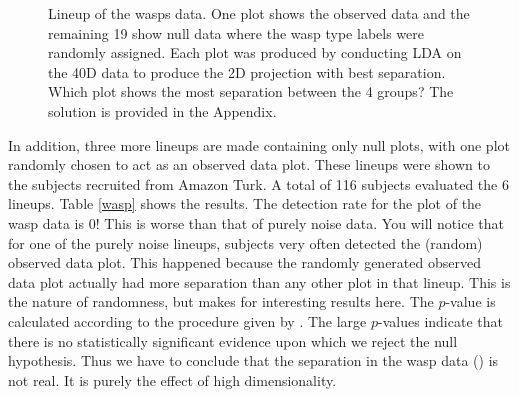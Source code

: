 \begin{figure}[hbtp]
   \centering
       \caption{Lineup of the wasps data. One plot shows the observed data and the remaining 19 show null data where the wasp type labels were randomly assigned. Each plot was produced by conducting LDA on the 40D data to produce the 2D projection with best separation. Which plot shows the most separation between the 4 groups? The solution is provided in the Appendix.}
       \label{toth_lineup}
\end{figure} 

In addition, three more lineups are made containing only null plots, with one plot randomly chosen to act as an observed data plot. These lineups were shown to the subjects recruited from Amazon Turk.  A total of 116 subjects evaluated the 6 lineups. Table \ref{wasp} shows the results. The detection rate for the plot of the wasp data is 0! This is worse than that of purely noise data. You will notice that for one of the purely noise lineups, subjects very often detected the (random) observed data plot. This happened because the randomly generated observed data plot actually had more separation than any other plot in that lineup. This is the nature of randomness, but makes for interesting results here. The $p$-value is calculated according to the procedure given by \cite{majumder:2013}. The large $p$-values indicate that there is no statistically significant evidence upon which we reject the null hypothesis. Thus we have to conclude that the separation in the wasp data (\cite{toth:2010}) is not real. It is purely the effect of high dimensionality. 

